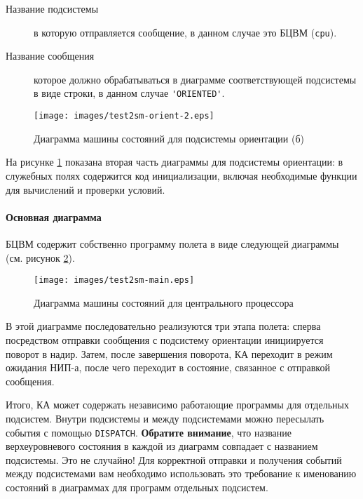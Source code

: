 \documentclass[12pt,a4paper]{article}
\begin{document}
\begin{description}
\item[Название подсистемы] в которую отправляется сообщение, в данном случае это БЦВМ
  (\verb'cpu').
\item[Название сообщения] которое должно обрабатываться в диаграмме соответствующей
  подсистемы в виде строки, в данном случае \verb"'ORIENTED'".
\end{description}

\begin{figure}[tbh]
  \begin{center}
    \texttt{[image: images/test2sm-orient-2.eps]}
    \caption{Диаграмма машины состояний для подсистемы ориентации (б)}
    \label{Pic:Test2SM-Orient-2}
  \end{center}
\end{figure}

На рисунке \ref{Pic:Test2SM-Orient-2} показана вторая часть диаграммы для подсистемы
ориентации: в служебных полях содержится код инициализации, включая необходимые функции
для вычислений и проверки условий. 

\paragraph{Основная диаграмма} БЦВМ содержит собственно программу полета в виде следующей
диаграммы (см. рисунок \ref{Pic:Test2SM-Main}).

\begin{figure}[tbh]
  \begin{center}
    \texttt{[image: images/test2sm-main.eps]}
    \caption{Диаграмма машины состояний для центрального процессора}
    \label{Pic:Test2SM-Main}
  \end{center}
\end{figure}

В этой диаграмме последовательно реализуются три этапа полета: сперва посредством отправки
сообщения с подсистему ориентации инициируется поворот в надир. Затем, после завершения
поворота, КА переходит в режим ожидания НИП-а, после чего переходит в состояние, связанное
с отправкой сообщения.

Итого, КА может содержать независимо работающие программы для отдельных подсистем. Внутри
подсистемы и между подсистемами можно пересылать события с помощью
\verb'DISPATCH'. \textbf{Обратите внимание}, что название верхеуровневого состояния в
каждой из диаграмм совпадает с названием подсистемы. Это не случайно! Для корректной
отправки и получения событий между подсистемами вам необходимо использовать это требование
к именованию состояний в диаграммах для программ отдельных подсистем.
\end{document}
